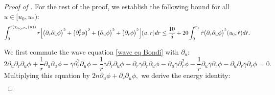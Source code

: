 \documentclass[11pt]{article}
\numberwithin{equation}{section}
\begin{document}
\begin{proof}[Proof of ]
    For the rest of the proof, we establish the following bound for all $u\in[u_0,u_*):$
    \begin{equation}\label{bound proved in mass gap thm pf}
    \int_0^{r(\chi_{u_0,r_*}(u))}r\Big[\big(\partial_r\partial_u\phi\big)^2+\big(\partial_r^2\phi\big)^2+\big(\partial_u\phi\big)^2+\big(\partial_r\phi\big)^2\Big](u,r)dr\leq\frac{10}{\delta}+20\int_0^{r_*}\Tilde{r}\big(\partial_r\partial_u\phi\big)^2(u_0,\Tilde{r})d\Tilde{r}.
    \end{equation}

    We first commute the wave equation \eqref{wave eq Bondi} with $\partial_u:$
    \[2\partial_u\partial_r\partial_u\phi+\frac{1}{r}\partial_u\partial_u\phi-\overline{\gamma}\partial_r^2\partial_u\phi-\frac{1}{r}\overline{\gamma}\partial_r\partial_u\phi-\partial_r\overline{\gamma}\partial_r\partial_u\phi-\partial_u\overline{\gamma}\partial_r^2\phi-\frac{1}{r}\partial_u\overline{\gamma}\partial_r\phi-\partial_u\partial_r\overline{\gamma}\partial_r\phi=0.\]
    Multiplying this equation by $2n\partial_u\phi+\partial_r\partial_u\phi,$ we derive the energy identity:
    \begin{align}

\end{align}
\end{proof}
\end{document}
